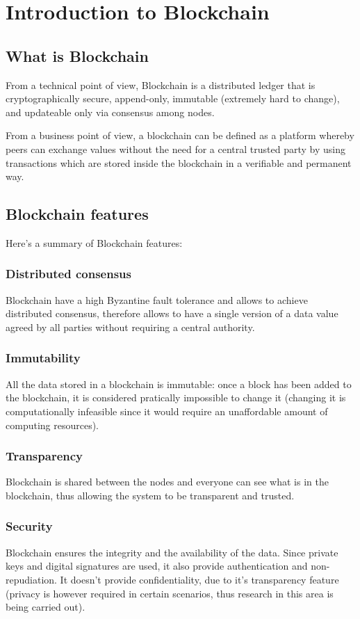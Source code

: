 \section{Introduction to Blockchain}
\subsection{What is Blockchain}
From a technical point of view, Blockchain is a distributed ledger that is cryptographically
secure, append-only, immutable (extremely hard to change), and updateable only
via consensus among nodes.

From a business point of view, a blockchain can be defined as a platform
whereby peers can exchange values without the need for a central trusted party
by using transactions which are stored inside the blockchain in a verifiable and
permanent way.






\subsection{Blockchain features}
Here's a summary of Blockchain features:
\subsubsection*{Distributed consensus}
Blockchain have a high Byzantine fault tolerance and allows to achieve
distributed consensus, therefore allows to have a single version of a data value
agreed by all parties without requiring a central authority.

\subsubsection*{Immutability}
All the data stored in a blockchain is immutable: once a block has been added to
the blockchain, it is considered pratically impossible to change it (changing it
is computationally infeasible since it would require an unaffordable amount of
computing resources).

\subsubsection*{Transparency}
Blockchain is shared between the nodes and everyone can see what is in the
blockchain, thus allowing the system to be transparent and trusted.

\subsubsection*{Security}
Blockchain ensures the integrity and the availability of the data. Since
private keys and digital signatures are used, it also provide authentication and
non-repudiation. It doesn't provide confidentiality, due to it's transparency
feature (privacy is however required in certain scenarios, thus research in
this area is being carried out).

